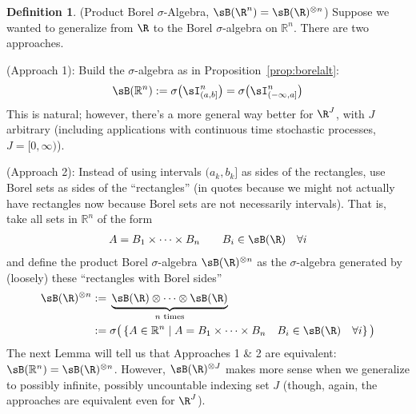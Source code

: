 \documentclass[12pt]{article}
\theoremstyle{plain}
\theoremstyle{definition}
\newtheorem{defn}[thm]{Definition}
\theoremstyle{remark}
\newcommand{\Rn}{\mathbb{R}^n}
\begin{document}
\begin{defn}
(Product Borel $\sigma$-Algebra, $\sB(\R^n)=\sB(\R)^{\otimes n}$)
Suppose we wanted to generalize from $\R$ to the Borel $\sigma$-algebra
on $\Rn$.
There are two approaches.

(Approach 1):
Build the $\sigma$-algebra as in Proposition~\ref{prop:borelalt}:
\begin{align*}
  \sB(\Rn) :=
  \sigma\big(\sI^n_{(a,b]}\big)
  = \sigma\big(\sI^n_{(-\infty,a]}\big)
\end{align*}
This is natural; however, there's a more general way better for $\R^J$,
with $J$ arbitrary (including applications with continuous time
stochastic processes, $J=[0,\infty)$).

(Approach 2):
Instead of using intervals $(a_k,b_k]$ as sides of the rectangles, use
Borel sets as sides of the ``rectangles'' (in quotes because we might
not actually have rectangles now because Borel sets are not necessarily
intervals).
That is, take all sets in $\Rn$ of the form
\begin{align*}
  A = B_1 \times \cdots \times B_n
  \qquad B_i \in \sB(\R) \quad\forall i
\end{align*}
and define the product Borel $\sigma$-algebra $\sB(\R)^{\otimes n}$ as
the $\sigma$-algebra generated by (loosely) these ``rectangles with
Borel sides''
\begin{align*}
  \sB(\R)^{\otimes n}
  :=&\; \underbrace{\sB(\R) \otimes \cdots \otimes \sB(\R)}_{\text{$n$ times}} \\
  :=&\;
  \sigma
  \big(
  \left\{
  A \in \Rn \;|\;
  A = B_1 \times \cdots \times B_n
  \quad B_i \in \sB(\R) \quad\forall i
  \right\}
  \big)
\end{align*}
The next Lemma will tell us that Approaches 1 \& 2 are equivalent:
$\sB(\Rn)=\sB(\R)^{\otimes n}$.
However, $\sB(\R)^{\otimes J}$ makes more sense when we generalize to
possibly infinite, possibly uncountable indexing set $J$ (though, again,
the approaches are equivalent even for $\R^J$).
\end{defn}
\end{document}
